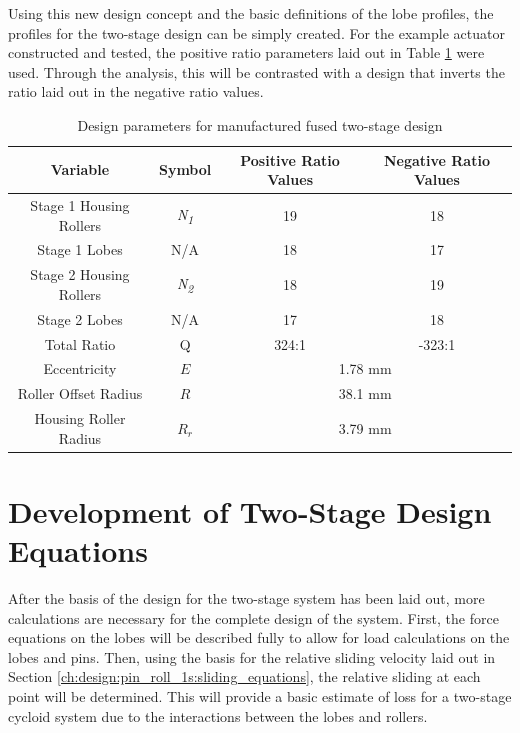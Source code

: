Using this new design concept and the basic definitions of the lobe profiles, the profiles for the two-stage design can be simply created. For the example actuator constructed and tested, the positive ratio parameters laid out in Table \ref{table:two_stage_design_params} were used. Through the analysis, this will be contrasted with a design that inverts the ratio laid out in the negative ratio values.
\begin{table}[t]
  \vskip0.2cm
  \caption{Design parameters for manufactured fused two-stage design}
  \label{table:two_stage_design_params}
  \begin{center}
    \vskip-0.2cm
	\begin{tabular}{|c|c|c|c|}
		\hline
		Variable & Symbol & Positive Ratio Values & Negative Ratio Values\\
		\hline
		Stage 1 Housing Rollers & \textit{N\textsubscript{1}} & 19 & 18\\
		\hline
		Stage 1 Lobes & N/A & 18 & 17\\
		\hline
		Stage 2 Housing Rollers & \textit{N\textsubscript{2}} & 18 & 19\\
		\hline
		Stage 2 Lobes & N/A & 17 & 18\\
		\hline
		Total Ratio & Q & 324:1  & -323:1 \\
		\hline
		Eccentricity & $E$ & \multicolumn{2}{c|}{1.78 mm} \\
		\hline
		Roller Offset Radius & $R$& \multicolumn{2}{c|}{38.1 mm} \\
		\hline
		Housing Roller Radius & $R_r$ & \multicolumn{2}{c|}{3.79 mm} \\
		\hline
	\end{tabular}
  \end{center}
\end{table}

\section{Development of Two-Stage Design Equations} \label{ch:dual:equations}

After the basis of the design for the two-stage system has been laid out, more calculations are necessary for the complete design of the system. First, the force equations on the lobes will be described fully to allow for load calculations on the lobes and pins. Then, using the basis for the relative sliding velocity laid out in Section \ref{ch:design:pin_roll_1s:sliding_equations}, the relative sliding at each point will be determined. This will provide a basic estimate of loss for a two-stage cycloid system due to the interactions between the lobes and rollers. 

